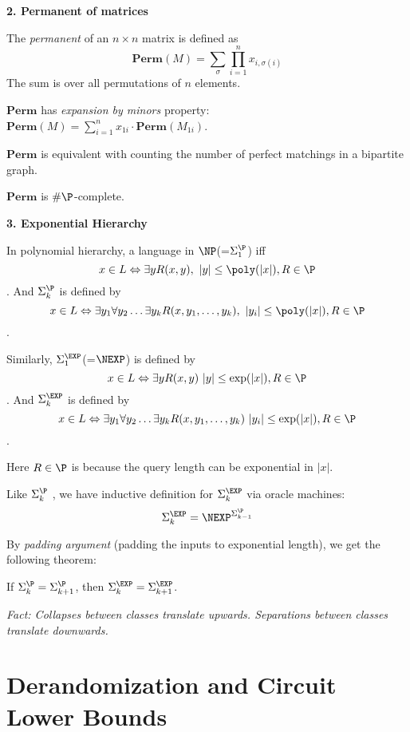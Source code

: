 \documentclass[letterpaper, 12pt]{article}
\newcommand{\Perm}{\mathbf{Perm}}
\begin{document}
\noindent \textbf{2. Permanent of matrices}

The \emph{permanent} of an $n \times n$ matrix is defined as
\[\Perm (M) = \sum_{\sigma} \prod_{i=1}^{n} x_{i, \sigma(i)}\]
The sum is over all permutations of $n$ elements.

$\Perm$ has \emph{expansion by minors} property: $\Perm(M) = \sum_{i = 1}^n x_{1i} \cdot \Perm(M_{1i})$.

$\Perm$ is equivalent with counting the number of perfect matchings in a bipartite graph.

\begin{theorem}[Valiant]
	$\Perm$ is $\#\P$-complete.
\end{theorem}

\bigskip

\noindent \textbf{3. Exponential Hierarchy}

In polynomial hierarchy, a language in $\NP$(=$\Sigma_1^\P$) iff
\[x \in L \Leftrightarrow \exists y R(x,y), \ |y| \leq \poly (|x|), R \in \P\].
And $\Sigma_k^\P$ is defined by
\[x \in L \Leftrightarrow \exists y_1 \forall y_2 \dots \exists y_k R(x,y_1, \dots, y_k), \ |y_i| \leq \poly (|x|), R \in \P\].

Similarly, $\Sigma_1^\EXP$(=$\NEXP$) is defined by
\[x \in L \Leftrightarrow \exists y R(x,y) \ |y| \leq \exp (|x|), R \in \P\].
And $\Sigma_k^\EXP$ is defined by \[x \in L \Leftrightarrow \exists y_1 \forall y_2 \dots \exists y_k R(x,y_1, \dots, y_k) \ |y_i| \leq \exp (|x|), R \in \P\].

Here $R \in \P$ is because the query length can be exponential in $|x|$.

\medskip

Like $\Sigma_k^\P$ , we have inductive definition for $\Sigma_k^\EXP $ via oracle machines:
\[\Sigma_k^\EXP = \NEXP^{\Sigma_{k-1}^\P}\]

By \emph{padding argument} (padding the inputs to exponential length), we get the following theorem:

\begin{theorem}
	If $\Sigma_k^{\P} = \Sigma_{k+1}^{\P}$, then  $\Sigma_k^{\EXP} = \Sigma_{k+1}^{\EXP}$.
\end{theorem}

\emph{Fact: Collapses between classes translate upwards. Separations between classes translate downwards.}

\section{Derandomization and Circuit Lower Bounds}
\end{document}
